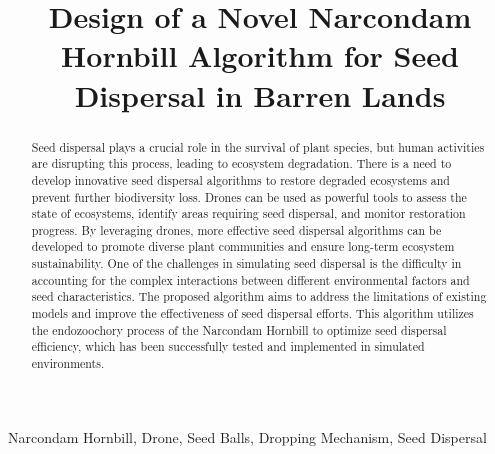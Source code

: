 \documentclass[conference]{IEEEtran}
\begin{document}
\title{Design of a Novel Narcondam Hornbill Algorithm for Seed Dispersal in Barren Lands}

\author{
\and
{}
\and
{}

}

\maketitle

\begin{abstract}
Seed dispersal plays a crucial role in the survival of plant species, but human activities are disrupting this process, leading to ecosystem degradation. There is a need to develop innovative seed dispersal algorithms to restore degraded ecosystems and prevent further biodiversity loss. Drones can be used as powerful tools to assess the state of ecosystems, identify areas requiring seed dispersal, and monitor restoration progress. By leveraging drones, more effective seed dispersal algorithms can be developed to promote diverse plant communities and ensure long-term ecosystem sustainability. One of the challenges in simulating seed dispersal is the difficulty in accounting for the complex interactions between different environmental factors and seed characteristics. The proposed algorithm aims to address the limitations of existing models and improve the effectiveness of seed dispersal efforts. This algorithm utilizes the endozoochory process of the Narcondam Hornbill to optimize seed dispersal efficiency, which has been successfully tested and implemented in simulated environments.
\end{abstract}

\begin{IEEEkeywords}
Narcondam Hornbill, Drone, Seed Balls, Dropping Mechanism, Seed Dispersal
\end{IEEEkeywords}
\end{document}
